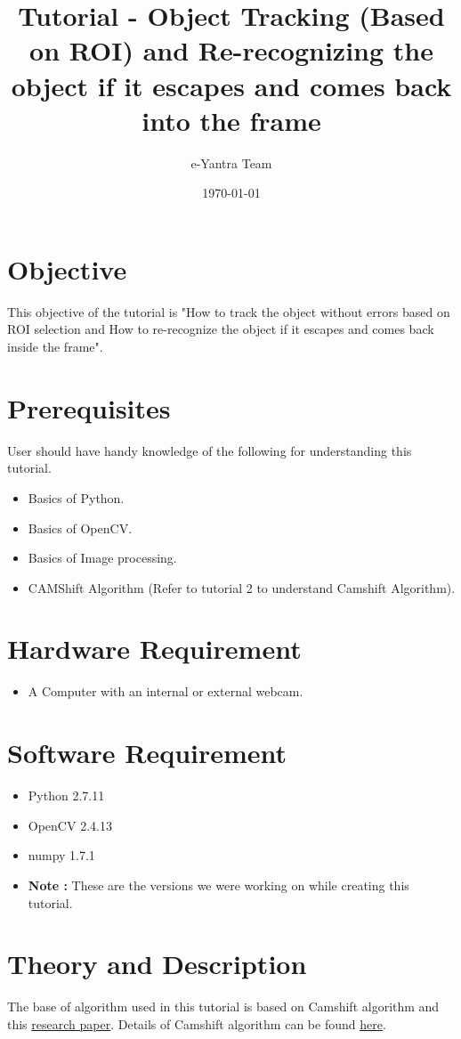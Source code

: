 \documentclass[11pt,a4paper]{article}
\title{Tutorial - Object Tracking (Based on ROI) and Re-recognizing the object if it escapes and comes back into the frame}
\author{e-Yantra Team}
\date{\today}
\begin{document}
	\maketitle
	\newpage
	\tableofcontents
	\newpage
	\section{Objective}
		This objective of the tutorial is "How to track the object without errors based on ROI selection and How to re-recognize the object if it escapes and comes back inside the frame".
	\section{Prerequisites}
		User should have handy knowledge of the following for understanding this tutorial.
		\begin{itemize}
			\item Basics of Python.
			\item Basics of OpenCV.
			\item Basics of Image processing.
			\item CAMShift Algorithm (Refer to tutorial 2 to understand Camshift Algorithm).
		\end{itemize}
	\section{Hardware Requirement}
		\begin{itemize}
			\item A Computer with an internal or external webcam.
		\end{itemize}
	\section{Software Requirement}
		\begin{itemize}
			\item Python 2.7.11
			\item OpenCV 2.4.13 
			\item numpy 1.7.1
			\item \textbf{Note :} These are the versions we were working on while creating this tutorial.
		\end{itemize}
	\section{Theory and Description}
		 The base of algorithm used in this tutorial is based on Camshift algorithm and this \href{http://vgl-ait.org/mdailey/uploads/publication_file/filename/106/Basit-CAMSHIFT.pdf}{research paper}. Details of Camshift algorithm can be found \href{https://github.com/eYSIP-2016/Object-Tracking-Camera/tree/master/Tutorials}{here}.
		 
\end{document}

